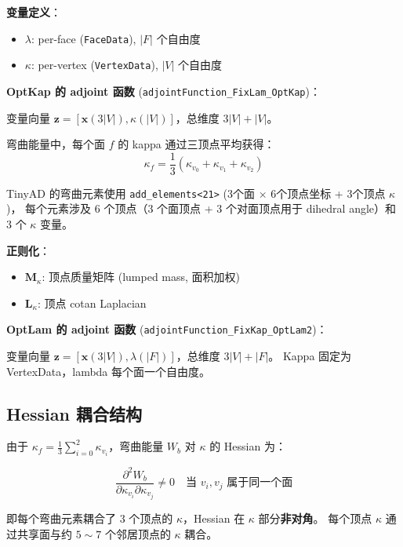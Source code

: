 \documentclass[12pt,a4paper]{article}
\begin{document}
\textbf{变量定义}：
\begin{itemize}
    \item $\lambda$: per-face (\texttt{FaceData}), $|F|$ 个自由度
    \item $\kappa$: per-vertex (\texttt{VertexData}), $|V|$ 个自由度
\end{itemize}

\textbf{OptKap 的 adjoint 函数}
(\texttt{adjointFunction\_FixLam\_OptKap})：

变量向量 $\mathbf{z} = [\mathbf{x}(3|V|), \kappa(|V|)]$，总维度 $3|V| + |V|$。

弯曲能量中，每个面 $f$ 的 kappa 通过三顶点平均获得：
\begin{equation}
    \kappa_f = \frac{1}{3}(\kappa_{v_0} + \kappa_{v_1} + \kappa_{v_2})
\end{equation}

TinyAD 的弯曲元素使用 \texttt{add\_elements<21>} (3个面 $\times$ 6个顶点坐标 + 3个顶点 $\kappa$)，
每个元素涉及 6 个顶点（3 个面顶点 + 3 个对面顶点用于 dihedral angle）和 3 个 $\kappa$ 变量。

\textbf{正则化}：
\begin{itemize}
    \item $\mathbf{M}_\kappa$: 顶点质量矩阵 (lumped mass, 面积加权)
    \item $\mathbf{L}_\kappa$: 顶点 cotan Laplacian
\end{itemize}

\textbf{OptLam 的 adjoint 函数}
(\texttt{adjointFunction\_FixKap\_OptLam2})：

变量向量 $\mathbf{z} = [\mathbf{x}(3|V|), \lambda(|F|)]$，总维度 $3|V| + |F|$。
Kappa 固定为 VertexData，lambda 每个面一个自由度。

\subsection{Hessian 耦合结构}

由于 $\kappa_f = \frac{1}{3}\sum_{i=0}^{2} \kappa_{v_i}$，弯曲能量 $W_b$ 对 $\kappa$ 的 Hessian 为：

\begin{equation}
    \frac{\partial^2 W_b}{\partial \kappa_{v_i} \partial \kappa_{v_j}} \neq 0
    \quad \text{当 } v_i, v_j \text{ 属于同一个面}
\end{equation}

即每个弯曲元素耦合了 3 个顶点的 $\kappa$，Hessian 在 $\kappa$ 部分\textbf{非对角}。
每个顶点 $\kappa$ 通过共享面与约 $5\sim7$ 个邻居顶点的 $\kappa$ 耦合。
\end{document}

